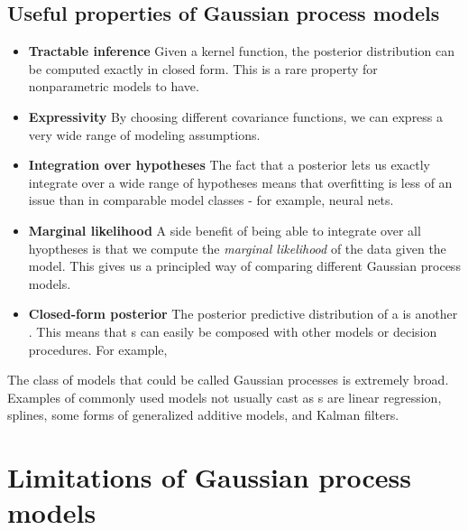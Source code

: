 \subsection{Useful properties of Gaussian process models}

\begin{itemize}

\item {\bf Tractable inference}
Given a kernel function, the posterior distribution can be computed exactly in closed form.  This is a rare property for nonparametric models to have.

\item {\bf Expressivity}
By choosing different covariance functions, we can express a very wide range of modeling assumptions.

\item {\bf Integration over hypotheses}
The fact that a \gp{} posterior lets us exactly integrate over a wide range of hypotheses means that overfitting is less of an issue than in comparable model classes - for example, neural nets.

\item {\bf Marginal likelihood}
A side benefit of being able to integrate over all hyoptheses is that we compute the \emph{marginal likelihood} of the data given the model.
This gives us a principled way of comparing different Gaussian process models.

\item {\bf Closed-form posterior}
The posterior predictive distribution of a \gp{} is another \gp{}.
This means that \gp{}s can easily be composed with other models or decision procedures.
For example, 

\end{itemize}

The class of models that could be called Gaussian processes is extremely broad.
Examples of commonly used models not usually cast as \gp{}s are linear regression, splines, some forms of generalized additive models, and Kalman filters.


\section{Limitations of Gaussian process models}

